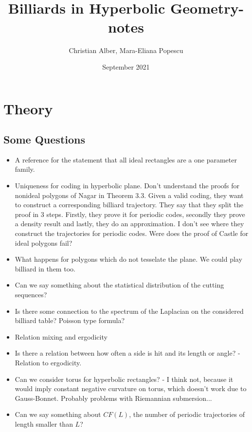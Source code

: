 \documentclass{article}
\title{Billiards in Hyperbolic Geometry-notes}
\author{Christian Alber, Mara-Eliana Popescu}
\date{September 2021}
\begin{document}
\maketitle
\section{Theory}
\subsection{Some Questions}
\begin{itemize}
	\item A reference for the statement that all ideal rectangles are a one parameter family.
	
    \item Uniqueness for coding in hyperbolic plane. Don't understand the proofs for nonideal polygons of Nagar in Theorem 3.3. Given a valid coding, they want to construct a corresponding billiard trajectory. They say that they split the proof in 3 steps. Firstly, they prove it for periodic codes, secondly they prove a density result and lastly, they do an approximation. I don't see where they construct the trajectories for periodic codes. Were does the proof of Castle for ideal polygons fail?
    
    \item What happens for polygons which do not tesselate the plane. We could play billiard in them too. 
    
    \item Can we say something about the statistical distribution of the cutting sequences?
    
    \item Is there some connection to the spectrum of the Laplacian on the considered billiard table? Poisson type formula?
    
    \item Relation mixing and ergodicity
    
    \item Is there a relation between how often a side is hit and its length or angle? - Relation to ergodicity.
    
    \item Can we consider torus for hyperbolic rectangles? - I think not, because it would imply constant negative curvature on torus, which doesn't work due to Gauss-Bonnet. Probably problems with Riemannian submersion...
    
    \item Can we say something about $CF(L)$, the number of periodic trajectories of length smaller than $L$?
\end{itemize}
\end{document}
